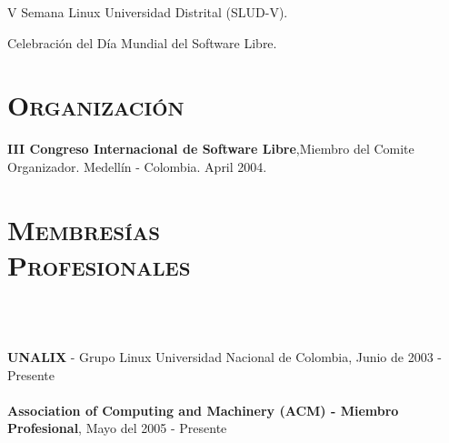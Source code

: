 \begin{resume}
\begin{position}
V Semana Linux Universidad Distrital (SLUD-V).
\end{position}


\begin{position}
Celebraci\'{o}n del D\'{i}a Mundial del Software Libre.
\end{position}
\newline
\newline
\newline
\newline
\newline




\section{\textsc{Organizaci\'{o}n}}
\employer{\textbf{}}
\dates{}
\textbf{III Congreso Internacional de Software Libre},Miembro del Comite Organizador. Medell\'{i}n - Colombia. April 2004.
\newline     


\section{\textsc{Membres\'{i}as\\ Profesionales}}

\begin{formatb}
  \\
  \body\\
\end{formatb}
\employer{}
   {\textbf{UNALIX} - Grupo Linux Universidad Nacional de Colombia,
     Junio de 2003 - Presente \\ \\
    \textbf{Association of Computing and Machinery (ACM) - Miembro Profesional}, Mayo del  2005 - Presente \\ 

     }


\end{resume}

